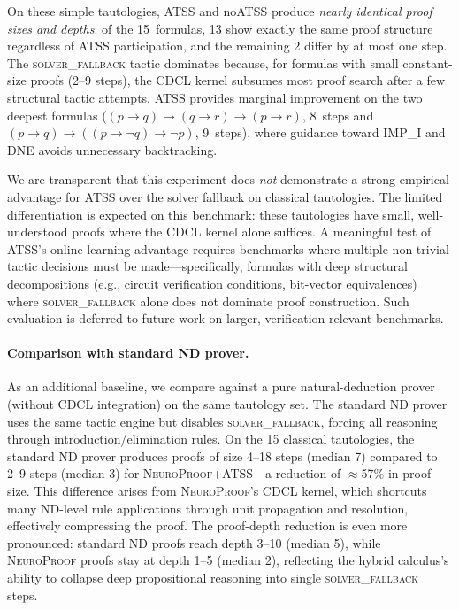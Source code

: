 \documentclass[conference]{IEEEtran}
\newcommand{\NP}{\textsc{NeuroProof}}
\newcommand{\ATSS}{\textsc{ATSS}}
\begin{document}
On these simple tautologies, ATSS and noATSS produce
\emph{nearly identical proof sizes and depths}: of the 15~formulas,
13 show exactly the same proof structure regardless of ATSS
participation, and the remaining 2 differ by at most one step.  The
\textsc{solver\_fallback} tactic dominates because, for formulas
with small constant-size proofs (2--9 steps), the CDCL kernel
subsumes most proof search after a few structural tactic attempts.
ATSS provides marginal improvement on the two deepest formulas
($(p \to q) \to (q \to r) \to (p \to r)$, 8~steps and
$(p \to q) \to ((p \to \neg q) \to \neg p)$, 9~steps), where
guidance toward \textsc{IMP\_I} and \textsc{DNE} avoids
unnecessary backtracking.

We are transparent that this experiment does \emph{not} demonstrate
a strong empirical advantage for ATSS over the solver fallback on
classical tautologies.  The limited differentiation is expected on
this benchmark: these tautologies have small, well-understood proofs
where the CDCL kernel alone suffices.  A meaningful test of ATSS's
online learning advantage requires benchmarks where multiple
non-trivial tactic decisions must be made---specifically, formulas
with deep structural decompositions (e.g., circuit verification
conditions, bit-vector equivalences) where \textsc{solver\_fallback}
alone does not dominate proof construction.  Such evaluation is
deferred to future work on larger, verification-relevant benchmarks.

\paragraph{Comparison with standard ND prover.}
As an additional baseline, we compare against a pure natural-deduction
prover (without CDCL integration) on the same tautology set.
The standard ND prover uses the same tactic engine but disables
\textsc{solver\_fallback}, forcing all reasoning through
introduction/elimination rules.  On the 15 classical tautologies,
the standard ND prover produces proofs of size 4--18 steps (median
7) compared to 2--9 steps (median 3) for \NP{}+\ATSS{}---a
reduction of $\approx$57\% in proof size.  This difference arises
from \NP{}'s CDCL kernel, which shortcuts many ND-level rule
applications through unit propagation and resolution, effectively
compressing the proof.  The proof-depth reduction is even more
pronounced: standard ND proofs reach depth 3--10 (median 5), while
\NP{} proofs stay at depth 1--5 (median 2), reflecting the hybrid
calculus's ability to collapse deep propositional reasoning into
single \textsc{solver\_fallback} steps.
\end{document}
